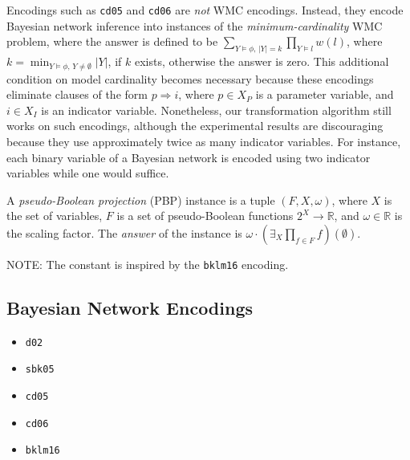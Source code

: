 \documentclass[runningheads]{llncs}
\begin{document}
\begin{remark}
  Encodings such as \texttt{cd05} and \texttt{cd06} are \emph{not} WMC
  encodings. Instead, they encode Bayesian network inference into instances of
  the \emph{minimum-cardinality} WMC problem, where the answer is defined to be
  $\sum_{Y \models \phi\text{, }|Y| = k} \prod_{Y \models l}
  w(l)$, where $k = \min_{Y \models \phi\text{, }Y \ne \emptyset}
  |Y|$, if $k$ exists, otherwise the answer is zero. This additional
  condition on model cardinality becomes necessary because these encodings
  eliminate clauses of the form $p \Rightarrow i$, where $p \in X_P$ is a
  parameter variable, and $i \in X_I$ is an indicator variable. Nonetheless, our
  transformation algorithm still works on such encodings, although the
  experimental results are discouraging because they use approximately twice as
  many indicator variables. For instance, each binary variable of a Bayesian
  network is encoded using two indicator variables while one would suffice.
\end{remark}

\begin{definition} \label{def:new_wmc}
  A \emph{pseudo-Boolean projection} (PBP) instance is a tuple $(F, X, \omega)$,
  where $X$ is the set of variables, $F$ is a set of pseudo-Boolean functions
  $2^X \to \mathbb{R}$, and $\omega \in \mathbb{R}$ is the scaling factor. The
  \emph{answer} of the instance is $\omega \cdot \left(\exists_X\prod_{f \in
      F}f\right)(\emptyset)$.
\end{definition}

NOTE: The constant is inspired by the \texttt{bklm16}
\cite{DBLP:conf/ecai/BartKLM16} encoding.

\subsection{Bayesian Network Encodings}

\begin{itemize}
\item \texttt{d02} \cite{DBLP:conf/kr/Darwiche02}
\item \texttt{sbk05} \cite{DBLP:conf/aaai/SangBK05}
\item \texttt{cd05} \cite{DBLP:conf/ijcai/ChaviraD05}
\item \texttt{cd06} \cite{DBLP:conf/sat/ChaviraD06}
\item \texttt{bklm16} \cite{DBLP:conf/ecai/BartKLM16}
\end{itemize}
\end{document}
